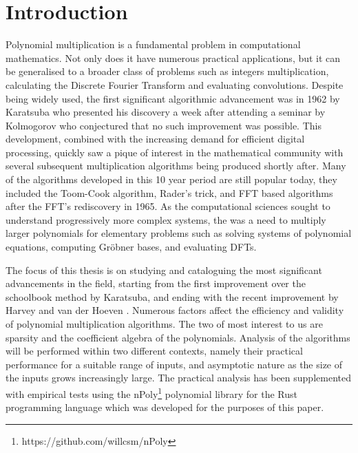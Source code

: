 \chapter{Introduction}\label{introduction}


Polynomial multiplication is a fundamental problem in computational mathematics. Not only does it have numerous practical applications, but it can be generalised to a broader class of problems such as integers multiplication, calculating the Discrete Fourier Transform and evaluating convolutions. Despite being widely used, the first significant algorithmic advancement was in 1962 by Karatsuba \cite{karatsuba} who presented his discovery a week after attending a seminar by Kolmogorov who conjectured that no such improvement was possible. This development, combined with the increasing demand for efficient digital processing, quickly saw a pique of interest in the mathematical community with several subsequent multiplication algorithms being produced shortly after. Many of the algorithms developed in this 10 year period are still popular today, they included the Toom-Cook algorithm, Rader's trick, and FFT based algorithms after the FFT's rediscovery in 1965. As the computational sciences sought to understand progressively more complex systems, the was a need to multiply larger polynomials for elementary problems such as solving systems of polynomial equations, computing Gr\"{o}bner bases, and evaluating DFTs. 


\medskip

The focus of this thesis is on studying and cataloguing the most significant advancements in the field, starting from the first improvement over the schoolbook method by Karatsuba, and ending with the recent improvement by Harvey and van der Hoeven \cite{nlogn}. Numerous factors affect the efficiency and validity of polynomial multiplication algorithms. The two of most interest to us are sparsity and the coefficient algebra of the polynomials. Analysis of the algorithms will be performed within two different contexts, namely their practical performance for a suitable range of inputs, and asymptotic nature as the size of the inputs grows increasingly large. The practical analysis has been supplemented with empirical tests using the nPoly\footnote{https://github.com/willcsm/nPoly} polynomial library for the Rust programming language which was developed for the purposes of this paper.

